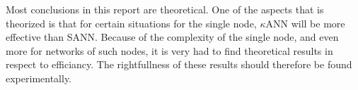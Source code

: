 % 

Most conclusions in this report are theoretical. 
One of the aspects that is theorized is that for certain situations for the single node, $\kappa$ANN will be more effective than SANN.
Because of the complexity of the single node, and even more for networks of such nodes, it is very had to find theoretical results in respect to efficiancy.
The rightfullness of these results should therefore be found experimentally.

